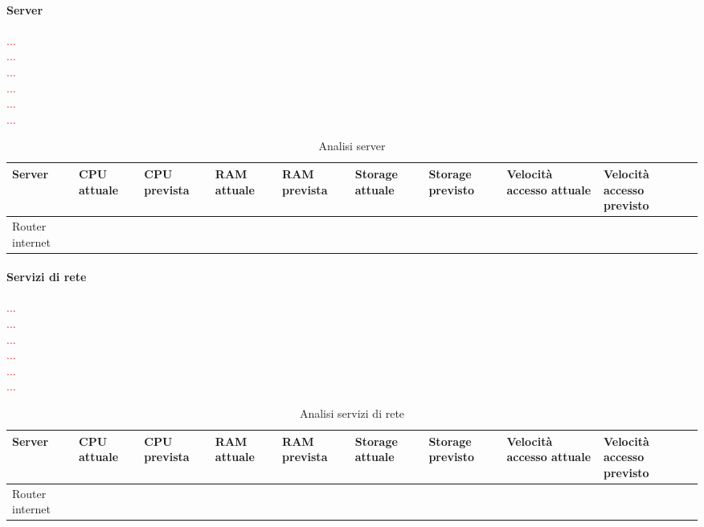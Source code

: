 	\paragraph{Server}
	\textcolor{red}{ ... \\  ... \\ ... \\ ... \\  ... \\ ... \\ }
	\begin{table}[h!]
		\begin{tabular}{|C{2cm} || C{1.5cm} |C{1.5cm} || C{1.5cm} |C{1.5cm}|| C{1.5cm} |C{1.5cm}||C{1.5cm} |C{1.5cm}|} 
			\hline
			\textbf{Server}  & \textbf{CPU attuale} & \textbf{CPU prevista} & \textbf{RAM attuale} & \textbf{RAM prevista} & \textbf{Storage attuale} & \textbf{Storage previsto} & \textbf{Velocità accesso attuale} & \textbf{Velocità accesso previsto}\\ \hline
			Router internet	& 	&  &   &  &	 & & & \\ \hline
		\end{tabular}
		\caption{Analisi server}\label{tab:analisiServer}
	\end{table}


	\paragraph{Servizi di rete}
	\textcolor{red}{ ... \\  ... \\ ... \\ ... \\  ... \\ ... \\ }
		\begin{table}[h!]
		\begin{tabular}{|C{2cm} || C{1.5cm} |C{1.5cm} || C{1.5cm} |C{1.5cm}|| C{1.5cm} |C{1.5cm}||C{1.5cm} |C{1.5cm}|} 
			\hline
			\textbf{Server}  & \textbf{CPU attuale} & \textbf{CPU prevista} & \textbf{RAM attuale} & \textbf{RAM prevista} & \textbf{Storage attuale} & \textbf{Storage previsto} & \textbf{Velocità accesso attuale} & \textbf{Velocità accesso previsto}\\ \hline
			Router internet	& 	&  &   &  &	 & & & \\ \hline
		\end{tabular}
		\caption{Analisi servizi di rete}\label{tab:analisiRete}
	\end{table}

